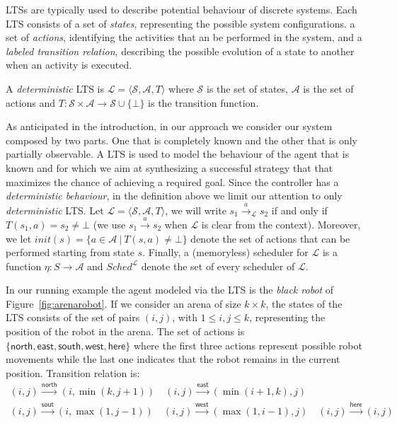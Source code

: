 \ac{LTS}s are typically used to describe potential behaviour of discrete systems. Each \ac{LTS} consists of a set of \emph{states}, representing the possible system configurations.
a set of \emph{actions}, identifying the activities that an be performed in the system, and a \emph{labeled transition relation}, describing the possible evolution of a state to another when 
an activity is executed.

\begin{definition}[\ac{LTS}]\label{def:lts}
	A \emph{deterministic} \ac{LTS} is $\mathcal{L} = \langle \mathcal{S}, \mathcal{A}, T \rangle$ where $\mathcal{S}$ is the set of states, $\mathcal{A}$ is the set of actions and $T : \mathcal{S} \times \mathcal{A} \rightarrow \mathcal{S} \cup \{ \bot \}$ is the transition function.
\end{definition}
As anticipated in the introduction, in our approach  we consider our system composed by two parts. 
One that is completely known and the other that is only partially observable. A \ac{LTS} is used to model the behaviour of the agent that is known and for which we aim at synthesizing a successful strategy that that maximizes the chance of achieving a required goal.
Since the controller has a \emph{deterministic behaviour}, in the definition above we limit our attention to only \emph{deterministic} \ac{LTS}. 
Let $\mathcal{L} = \langle \mathcal{S}, \mathcal{A}, T \rangle$, we will write $s_1\xrightarrow{a}_{\mathcal{L}} s_2$ if and only if $T(s_1,a)=s_2\not=\bot$ (we use $s_1\xrightarrow{a} s_2$ when $\mathcal{L}$ is clear from the context). 
Moreover, we let $init(s) = \{ a \in \mathcal{A}\ |\ T(s,a) \neq \bot \}$ denote the set of actions that can be performed starting from state $s$. 
Finally, a (memoryless) scheduler for $\mathcal{L}$ is a function $\eta : S \rightarrow \mathcal{A}$ 
and $Sched^\mathcal{L}$ denote the set of every scheduler of $\mathcal{L}$.

\begin{example}{}
\label{ex:controller} 
In our running example the agent modeled via the \ac{LTS} is the \emph{black robot} of Figure~\ref{fig:arenarobot}. If we consider an arena of size $k\times k$, 
the states of the \ac{LTS} consists of the set of pairs $(i,j)$, with $1\leq i,j\leq k$, representing the position of the robot in the arena. 
The set of actions is $\{ \mathsf{north}, \mathsf{east}, \mathsf{south}, \mathsf{west}, \mathsf{here} \}$ where the first three actions represent possible robot movements while the last one indicates that the robot remains in the current position. 
Transition relation is:
\[
\begin{array}{c}
(i,j) \xrightarrow{\mathsf{north}} (i,\min(k,j+1))\quad
(i,j) \xrightarrow{\mathsf{east}} (\min(i+1,k),j) \\[.25cm]
(i,j) \xrightarrow{\mathsf{sout}} (i,\max(1,j-1)) \quad
(i,j) \xrightarrow{\mathsf{west}} (\max(1,i-1),j) \quad
(i,j) \xrightarrow{\mathsf{here}} (i,j)
\end{array}
\]
\end{example}

